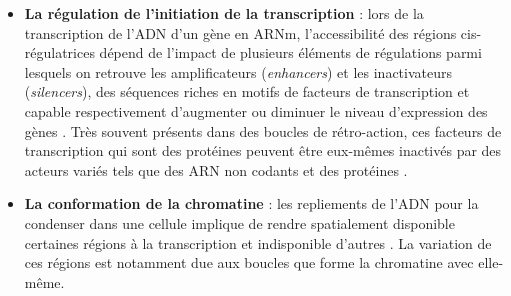 \begin{itemize}
    \item \textbf{La régulation de l'initiation de la transcription} : lors de la transcription de l'ADN d'un gène en ARNm, l'accessibilité des régions cis-régulatrices dépend de l'impact de plusieurs éléments de régulations parmi lesquels on retrouve les amplificateurs (\textit{enhancers}) et les inactivateurs (\textit{silencers}), des séquences riches en motifs de facteurs de transcription et capable respectivement d'augmenter ou diminuer le niveau d'expression des gènes \cite{Levo2014Jul}. Très souvent présents dans des boucles de rétro-action, ces facteurs de transcription qui sont des protéines peuvent être eux-mêmes inactivés par des acteurs variés tels que des ARN non codants et des protéines \cite{Chen2020May}.
    \item \textbf{La conformation de la chromatine} : les repliements de l'ADN pour la condenser dans une cellule implique de rendre spatialement disponible certaines régions à la transcription et indisponible d'autres \cite{Kadauke2009Jan}. La variation de ces régions est notamment due aux boucles que forme la chromatine avec elle-même.

\end{itemize}
